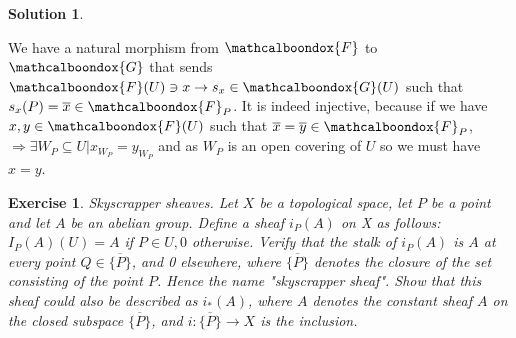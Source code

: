 \documentclass[12pt]{article}
\newcommand{\imp}{\ensuremath{\Rightarrow}}
\newtheorem{ex}{Exercise}[section]
\theoremstyle{definition}
\newtheorem*{sol}{Solution}
\newcommand{\sF}{\ensuremath{\mathcalboondox{F}}}
\newcommand{\sG}{\ensuremath{\mathcalboondox{G}}}
\begin{document}
\begin{sol}
\begin{enumerate}[label=\alph*)]
		We have a natural morphism from $\sF$ to $\sG$ that sends $\sF(U) \ni x \to s_x \in \sG(U)$ such that $s_x(P) = \overline{x} \in \sF_P$. It is indeed injective, because if we have $x,y \in \sF(U)$ such that $\overline{x} = \overline{y} \in \sF_P$, $\imp \exists W_P \subseteq U | x_{W_P} = y_{W_P}$ and as $W_P$ is an open covering of $U$ so we must have $x = y$.
	\end{enumerate}
\end{sol}

\begin{ex}
	Skyscrapper sheaves. Let $X$ be a topological space, let $P$ be a point and let $A$ be an abelian group. Define a sheaf $i_P(A)$ on X as follows: $I_P(A)(U) = A$ if $P \in U, 0$ otherwise. Verify that the stalk of $i_P(A)$ is $A$ at every point $Q \in \overline{\{P\}}$, and 0 elsewhere, where $\overline{\{P\}}$ denotes the closure of the set consisting of the point $P$. Hence the name "skyscrapper sheaf". Show that this sheaf could also be described as $i_{*}(A)$, where $A$ denotes the constant sheaf $A$ on the closed subspace $\overline{\{P\}}$, and $i: \overline{\{P\}} \to X$ is the inclusion.
\end{ex}
\end{document}
